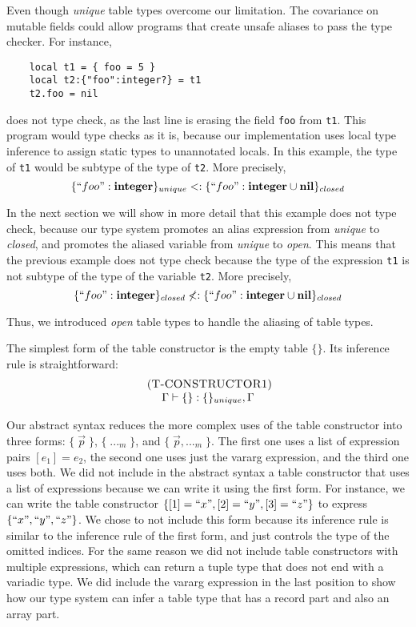 Even though \emph{unique} table types overcome our limitation.
The covariance on mutable fields could allow programs that create unsafe
aliases to pass the type checker.
For instance,
\begin{verbatim}
    local t1 = { foo = 5 }
    local t2:{"foo":integer?} = t1
    t2.foo = nil
\end{verbatim}
does not type check, as the last line is erasing the field \texttt{foo}
from \texttt{t1}.
This program would type checks as it is, because our implementation uses
local type inference to assign static types to unannotated locals.
In this example, the type of \texttt{t1} would be subtype of the type of \texttt{t2}.
More precisely,
\[
\{``foo":\mathbf{integer}\}_{unique} <: \{``foo":\mathbf{integer} \cup \mathbf{nil}\}_{closed}
\]

In the next section we will show in more detail that this example
does not type check, because our type system promotes an alias
expression from \emph{unique} to \emph{closed}, and promotes the
aliased variable from \emph{unique} to \emph{open}.
This means that the previous example does not type check because
the type of the expression \texttt{t1} is not subtype of the type
of the variable \texttt{t2}.
More precisely,
\[
\{``foo":\mathbf{integer}\}_{closed} \not<: \{``foo":\mathbf{integer} \cup \mathbf{nil}\}_{closed}
\]

Thus, we introduced \emph{open} table types to handle the aliasing of table types.

The simplest form of the table constructor is the empty table $\{\}$.
Its inference rule is straightforward:
\[
\begin{array}{c}
\; (\textsc{T-CONSTRUCTOR1})\\
\Gamma \vdash \{\}:\{\}_{unique}, \Gamma
\end{array}
\]

Our abstract syntax reduces the more complex uses of the table
constructor into three forms: $\{\;\vec{p}\;\}$, $\{\;{...}_{m}\;\}$,
and $\{\;\vec{p},{...}_{m}\;\}$.
The first one uses a list of expression pairs $[e_{1}] = e_{2}$,
the second one uses just the vararg expression, and the third one uses both.
We did not include in the abstract syntax a table constructor
that uses a list of expressions because we can write it using the first form.
For instance, we can write the table constructor
$\{ [1] = ``x", [2] = ``y", [3] = ``z" \}$ to express $\{ ``x", ``y", ``z" \}$.
We chose to not include this form because its inference rule is similar
to the inference rule of the first form, and just controls the type of
the omitted indices.
For the same reason we did not include table constructors with
multiple expressions, which can return a tuple type that does not end
with a variadic type.
We did include the vararg expression in the last position to show how
our type system can infer a table type that has a record part and
also an array part.

